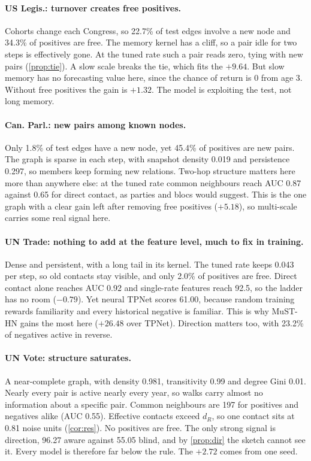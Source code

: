 \documentclass[11pt,a4paper]{article}
\theoremstyle{plain}
\theoremstyle{definition}
\begin{document}
\paragraph{US Legis.: turnover creates free positives.} Cohorts change each Congress, so 22.7\% of test edges involve a new node and 34.3\% of positives are free. The memory kernel has a cliff, so a pair idle for two steps is effectively gone. At the tuned rate such a pair reads zero, tying with new pairs (\cref{prop:tie}). A slow scale breaks the tie, which fits the $+9.64$. But slow memory has no forecasting value here, since the chance of return is 0 from age 3. Without free positives the gain is $+1.32$. The model is exploiting the test, not long memory.

\paragraph{Can. Parl.: new pairs among known nodes.} Only 1.8\% of test edges have a new node, yet 45.4\% of positives are new pairs. The graph is sparse in each step, with snapshot density 0.019 and persistence 0.297, so members keep forming new relations. Two-hop structure matters here more than anywhere else: at the tuned rate common neighbours reach AUC 0.87 against 0.65 for direct contact, as parties and blocs would suggest. This is the one graph with a clear gain left after removing free positives ($+5.18$), so multi-scale carries some real signal here.

\paragraph{UN Trade: nothing to add at the feature level, much to fix in training.} Dense and persistent, with a long tail in its kernel. The tuned rate keeps 0.043 per step, so old contacts stay visible, and only 2.0\% of positives are free. Direct contact alone reaches AUC 0.92 and single-rate features reach 92.5, so the ladder has no room ($-0.79$). Yet neural TPNet scores 61.00, because random training rewards familiarity and every historical negative is familiar. This is why MuST-HN gains the most here ($+26.48$ over TPNet). Direction matters too, with 23.2\% of negatives active in reverse.

\paragraph{UN Vote: structure saturates.} A near-complete graph, with density 0.981, transitivity 0.99 and degree Gini 0.01. Nearly every pair is active nearly every year, so walks carry almost no information about a specific pair. Common neighbours are 197 for positives and negatives alike (AUC 0.55). Effective contacts exceed $d_R$, so one contact sits at 0.81 noise units (\cref{cor:res}). No positives are free. The only strong signal is direction, 96.27 aware against 55.05 blind, and by \cref{prop:dir} the sketch cannot see it. Every model is therefore far below the rule. The $+2.72$ comes from one seed.
\end{document}
